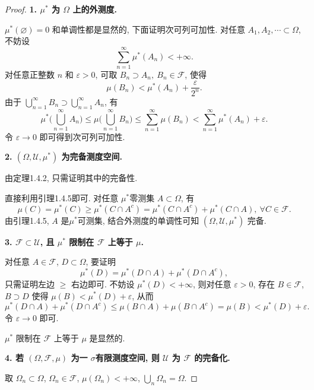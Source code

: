         \begin{proof}
            \textbf{1. $\mu^*$ 为 $\Omega$ 上的外测度.}

            $\mu^*(\varnothing)=0$ 和单调性都是显然的, 下面证明次可列可加性.
            对任意 $A_1,A_2,\cdots \subset \Omega$, 不妨设
            \[
                \sum_{n=1}^\infty \mu^*(A_n)<+\infty.
            \]
            对任意正整数 $n$ 和 $\varepsilon>0$, 
            可取 $B_n\supset A_n,\ B_n\in\mathcal{F}$, 使得
            \[
                \mu(B_n)<\mu^*(A_n)+\frac{\varepsilon}{2^n}.
            \]
            由于 $\displaystyle\bigcup_{n=1}^\infty B_n\supset\bigcup_{n=1}^\infty A_n$, 有
            \[
                \mu^*\big(\bigcup_{n=1}^\infty A_n\big)\leqslant \mu\big(\bigcup_{n=1}^\infty B_n\big)\leqslant\sum_{n=1}^\infty\mu(B_n)<\sum_{n=1}^\infty\mu^*(A_n)+\varepsilon.
            \]
            令 $\varepsilon\to 0$ 即可得到次可列可加性.

            \textbf{2. $(\Omega,\mathcal{U},\mu^*)$ 为完备测度空间.}

            由定理1.4.2, 只需证明其中的完备性. 
            
            直接利用引理1.4.5即可. 对任意 $\mu^*$零测集 $A\subset\Omega$, 有
            \[
                \mu(C)=\mu^*(C)\geqslant\mu^*(C\cap A^c)=\mu^*(C\cap A^c)+\mu^*(C\cap A),\ \forall C\in\mathcal{F}.
            \]
            由引理1.4.5, $A$ 是$\mu^*$可测集, 结合外测度的单调性可知 $(\Omega,\mathcal{U},\mu^*)$ 完备.

            \textbf{3. $\mathcal{F}\subset\mathcal{U}$, 且 $\mu^*$ 限制在 $\mathcal{F}$ 上等于 $\mu$.}

            对任意 $A\in\mathcal{F}$, $D\subset\Omega$, 要证明
            \[
                \mu^*(D)=\mu^*(D\cap A)+\mu^*(D\cap A^c), 
            \]
            只需证明左边 $\geqslant$ 右边即可. 
            不妨设 $\mu^*(D)<+\infty$, 
            则对任意 $\varepsilon>0$, 
            存在 $B\in\mathcal{F}$, $B\supset D$ 使得 $\mu(B)<\mu^*(D)+\varepsilon$, 从而
            \[
                \mu^*(D\cap A)+\mu^*(D\cap A^c)\leqslant \mu(B\cap A)+\mu(B\cap A^c)=\mu(B)<\mu^*(D)+\varepsilon.
            \]
            令 $\varepsilon\to 0$ 即可.

            $\mu^*$ 限制在 $\mathcal{F}$ 上等于 $\mu$ 是显然的.

            \textbf{4. 若 $(\Omega,\mathcal{F},\mu)$ 为一 $\sigma$有限测度空间, 则 $\mathcal{U}$ 为 $\mathcal{F}$ 的完备化.}

            取 $\Omega_n\subset\Omega$, 
            $\Omega_n\in\mathcal{F}$, 
            $\mu(\Omega_n)<+\infty$, 
            $\displaystyle\bigcup_n\Omega_n=\Omega$.


\end{proof}
